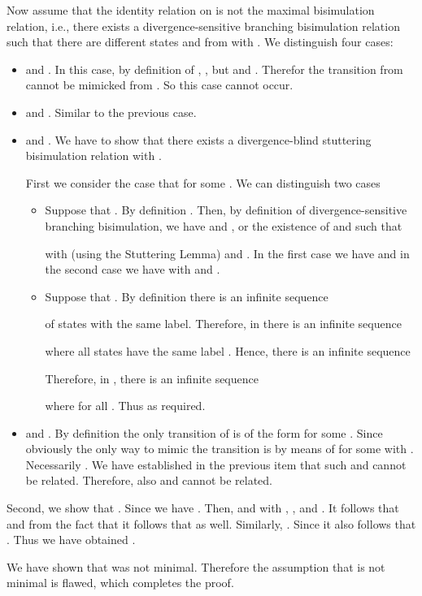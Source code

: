 \documentclass{llncs}
\begin{document}
Now assume that the identity relation on  is not the maximal bisimulation relation, i.e.,  there exists a divergence-sensitive branching bisimulation relation  such that there are different states  and  from  with . We distinguish four cases:
\begin{itemize}
\item  and . In this case, by definition of , , but  and . Therefor the transition from  cannot be mimicked from . So this case cannot occur.

\item  and . Similar to the previous case.

\item  and . We have to show that there exists a divergence-blind stuttering bisimulation relation  with .

First we consider the case that  for some . We can distinguish two cases
\begin{itemize}
\item Suppose that . By definition . Then, by definition of divergence-sensitive branching bisimulation, we have  and , or the existence of  and  such that
    
     with  (using the Stuttering Lemma) and . In the first case we have  and in the second case we have   with  and .
\item Suppose that . By definition there is an infinite sequence
    
    of states with the same label. Therefore, in  there is an infinite sequence
    
    where all states have the same label .
    Hence, there is an infinite sequence
    
    Therefore, in , there is an infinite sequence
    
    where  for all .
    Thus  as required.
\end{itemize}

\item  and . By definition the only transition of  is of the form  for some . Since  obviously the only way to mimic the transition is by means of  for some  with . Necessarily . We have established in the previous item that such  and  cannot be related. Therefore, also  and  cannot be related.
\end{itemize}

Second, we show that . Since  we have . Then,  and  with , ,  and .
It follows that  and from the fact that  it follows that  as well. Similarly, . Since  it also follows that . Thus we have obtained .

We have shown that  was not minimal. Therefore the assumption that  is not minimal is flawed, which completes the proof.
\end{document}
